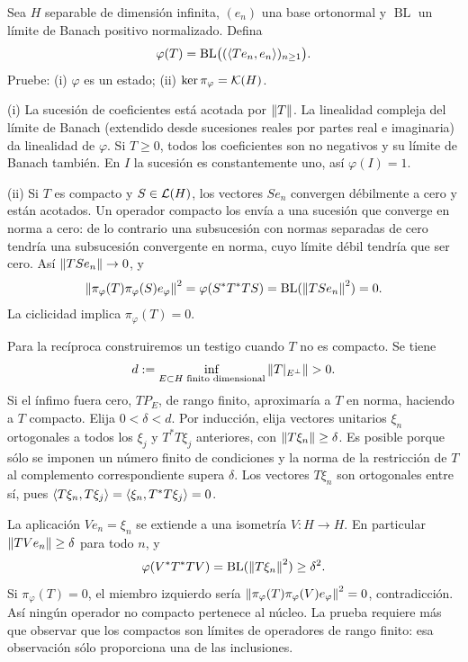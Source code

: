 \begin{ejercicio}\label{ej:v3-l29-3}
Sea $H$ separable de dimensión infinita, $(e_n)$ una base ortonormal y $\operatorname{BL}$ un límite de Banach positivo normalizado. Defina
\[
 \varphi(T)=\operatorname{BL}\bigl((\left\langle Te_n,e_n\right\rangle)_{n\ge1}\bigr).
\]
Pruebe: (i) $\varphi$ es un estado; (ii) $\ker\pi_\varphi=\mathcal K(H)$.
\end{ejercicio}
\begin{solucion}
(i) La sucesión de coeficientes está acotada por $\left\lVert T\right\rVert$. La linealidad compleja del límite de Banach (extendido desde sucesiones reales por partes real e imaginaria) da linealidad de $\varphi$. Si $T\ge0$, todos los coeficientes son no negativos y su límite de Banach también. En $I$ la sucesión es constantemente uno, así $\varphi(I)=1$.

(ii) Si $T$ es compacto y $S\in\mathcal L(H)$, los vectores $Se_n$ convergen débilmente a cero y están acotados. Un operador compacto los envía a una sucesión que converge en norma a cero: de lo contrario una subsucesión con normas separadas de cero tendría una subsucesión convergente en norma, cuyo límite débil tendría que ser cero. Así $\left\lVert TSe_n\right\rVert\to0$, y
\[
 \left\lVert\pi_\varphi(T)\pi_\varphi(S)e_\varphi\right\rVert^2
 =\varphi(S^*T^*TS)=\operatorname{BL}(\left\lVert TSe_n\right\rVert^2)=0.
\]
La ciclicidad implica $\pi_\varphi(T)=0$.

Para la recíproca construiremos un testigo cuando $T$ no es compacto. Se tiene
\[
 d:=\inf_{E\subset H\text{ finito dimensional}}
 \left\lVert T|_{E^\perp}\right\rVert>0.
\]
Si el ínfimo fuera cero, $TP_E$, de rango finito, aproximaría a $T$ en norma, haciendo a $T$ compacto. Elija $0<\delta<d$. Por inducción, elija vectores unitarios $\xi_n$ ortogonales a todos los $\xi_j$ y $T^*T\xi_j$ anteriores, con $\left\lVert T\xi_n\right\rVert\ge\delta$. Es posible porque sólo se imponen un número finito de condiciones y la norma de la restricción de $T$ al complemento correspondiente supera $\delta$. Los vectores $T\xi_n$ son ortogonales entre sí, pues $\left\langle T\xi_n,T\xi_j\right\rangle=\left\langle\xi_n,T^*T\xi_j\right\rangle=0$.

La aplicación $Ve_n=\xi_n$ se extiende a una isometría $V:H\to H$. En particular $\left\lVert TVe_n\right\rVert\ge\delta$ para todo $n$, y
\[
 \varphi(V^*T^*TV)=\operatorname{BL}(\left\lVert T\xi_n\right\rVert^2)\ge\delta^2.
\]
Si $\pi_\varphi(T)=0$, el miembro izquierdo sería $\left\lVert\pi_\varphi(T)\pi_\varphi(V)e_\varphi\right\rVert^2=0$, contradicción. Así ningún operador no compacto pertenece al núcleo. La prueba requiere más que observar que los compactos son límites de operadores de rango finito: esa observación sólo proporciona una de las inclusiones.
\end{solucion}

